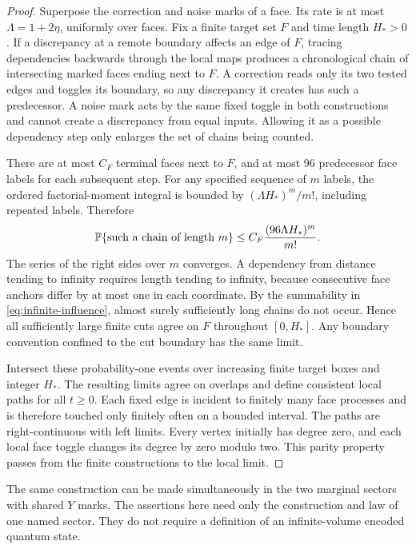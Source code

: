 \begin{proof}
Superpose the correction and noise marks of a face. Its rate is at
most \(\Lambda=1+2\eta\), uniformly over faces. Fix a finite target
set \(F\) and time length \(H_*>0\). If a discrepancy at a remote
boundary affects an edge of \(F\), tracing dependencies backwards
through the local maps produces a chronological chain of intersecting
marked faces ending next to \(F\). A correction reads only its two
tested edges and toggles its boundary, so any discrepancy it creates
has such a predecessor. A noise mark acts by the same fixed toggle
in both constructions and cannot create a discrepancy from equal
inputs. Allowing it as a possible dependency step only enlarges
the set of chains being counted.

There are at most \(C_F\) terminal faces next to \(F\), and at most
96 predecessor face labels for each subsequent step. For any
specified sequence of \(m\) labels, the ordered factorial-moment
integral is bounded by \((\Lambda H_*)^m/m!\), including repeated
labels. Therefore
\begin{equation}\label{eq:infinite-influence}
 \mathbb P\{\text{such a chain of length }m\}
 \le C_F\frac{(96\Lambda H_*)^m}{m!}.
\end{equation}
The series of the right sides over \(m\) converges. A dependency
from distance tending to infinity requires length tending to
infinity, because consecutive face anchors differ by at most one
in each coordinate. By the summability in
\eqref{eq:infinite-influence}, almost surely sufficiently long
chains do not occur. Hence all sufficiently large finite cuts
agree on \(F\) throughout \([0,H_*]\). Any boundary convention
confined to the cut boundary has the same limit.

Intersect these probability-one events over increasing finite target
boxes and integer \(H_*\). The resulting limits agree on overlaps
and define consistent local paths for all \(t\ge0\).
Each fixed edge is incident to finitely many face processes and
is therefore touched only finitely often on a bounded interval.
The paths are right-continuous with left limits. Every vertex
initially has degree zero, and each local face toggle changes its
degree by zero modulo two. This parity property passes from the
finite constructions to the local limit.
\end{proof}

The same construction can be made simultaneously in the two
marginal sectors with shared \(Y\) marks. The assertions here need
only the construction and law of one named sector. They do not
require a definition of an infinite-volume encoded quantum state.


